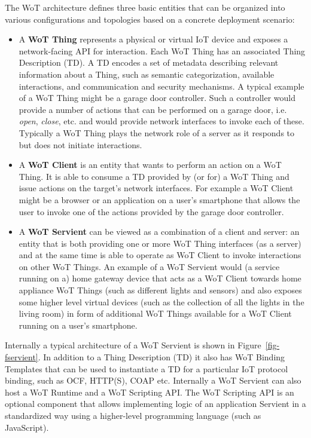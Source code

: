 The WoT architecture\cite{Wot2017arch} defines three basic entities
that can be organized into various configurations and topologies 
based on a concrete deployment scenario:

\begin{itemize}
	\item A \textbf{WoT Thing} represents a physical or virtual IoT device 
        and exposes a network-facing API for interaction.
	Each WoT Thing has an associated Thing Description (TD)\cite{Wot2017td}. 
        A TD encodes a set of metadata describing relevant information about a Thing,
        such as semantic categorization, available interactions, and communication and security mechanisms.
	A typical example of a WoT Thing might be a garage door controller.
        Such a controller would provide a number of actions that can be performed on a garage door, 
        i.e. \textit{open}, \textit{close}, etc. and would provide network interfaces to invoke
        each of these.
        Typically a WoT Thing plays the network role of a server as it responds to
        but does not initiate interactions.
	\item A \textbf{WoT Client} is an entity that wants to perform an action on a WoT Thing.
	It is able to consume a TD provided by (or for) a WoT Thing and issue actions on 
        the target's network interfaces.
	For example a WoT Client might be a browser or an application on a user's smartphone
        that allows the user to invoke one of the actions provided by the garage door controller. 
	\item A \textbf{WoT Servient} can be viewed as a combination of a client and server:
        an entity that is both providing one or more WoT Thing interfaces (as a server) and
        at the same time is able to operate as WoT Client to invoke interactions on other WoT Things.
	An example of a WoT Servient would (a service running on a) home gateway device 
        that acts as a WoT Client towards home appliance WoT Things
        (such as different lights and sensors) and also exposes some higher level
        virtual devices (such as the collection of all the lights in the living room)
        in form of additional WoT Things available for a WoT Client running on a user's smartphone.
\end{itemize}

Internally a typical architecture of a WoT Servient is shown in Figure~\ref{fig-fservient}. 
In addition to a Thing Description (TD) it also has WoT Binding Templates 
that can be used to instantiate a TD for a particular IoT protocol binding, 
such as OCF, HTTP(S), COAP etc. 
Internally a WoT Servient can also host a WoT Runtime and
a WoT Scripting API.
The WoT Scripting API is an optional component that allows 
implementing logic of an application Servient in a standardized way
using a higher-level programming language (such as JavaScript). 

